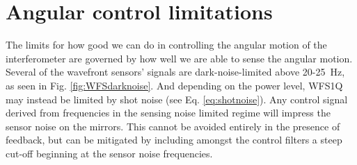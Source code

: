\section{Angular control limitations}
\label{sec:ASClimits}
The limits for how good we can do in controlling the angular motion of the interferometer are governed by how well we are able to sense the angular motion. Several of the wavefront sensors' signals are dark-noise-limited above 20-25~Hz, as seen in Fig. \ref{fig:WFSdarknoise}. And depending on the power level, WFS1Q may instead be limited by shot noise (see Eq. \ref{eq:shotnoise}). Any control signal derived from frequencies in the sensing noise limited regime will impress the sensor noise on the mirrors. This cannot be avoided entirely in the presence of feedback, but can be mitigated by including amongst the control filters a steep cut-off beginning at the sensor noise frequencies. 

